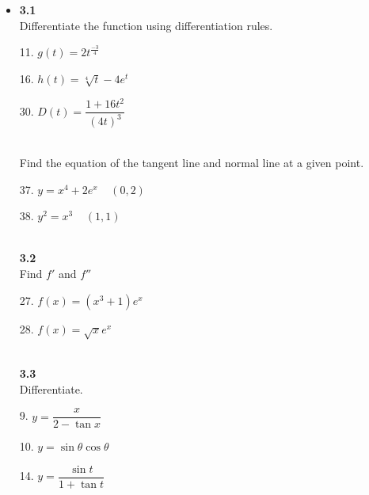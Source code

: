 \documentclass{letter}
\begin{document}
	\begin{itemize}
		\item[] \textbf{3.1}\\
		
		Differentiate the function using differentiation rules.\\
		\begin{minipage}[t]{0.3\textwidth}
			11. $g(t) = 2t^{\frac{-3}{4}}$
		\end{minipage}
		\begin{minipage}[t]{0.3\textwidth}
			16. $h(t) = \sqrt[4]{t} - 4e^t$
		\end{minipage}
		\begin{minipage}[t]{0.3\textwidth}
			30. $D(t) = \dfrac{1+16t^2}{(4t)^3}$\\
		\end{minipage}\\
		
		Find the equation of the tangent line and normal line at a given point.\\
		\begin{minipage}[t]{0.5\textwidth}
			37. $y = x^4 + 2e^x \;\;\;\; (0, 2)$
		\end{minipage}
		\begin{minipage}[t]{0.5\textwidth}
			38. $y^2 = x^3 \;\;\;\; (1, 1)$\\
		\end{minipage}\\
		
		\textbf{3.2}\\
		
		Find $f'$ and $f''$\\
		\begin{minipage}[t]{0.5\textwidth}
			27. $f(x) = (x^3 + 1)e^x$
		\end{minipage}
		\begin{minipage}[t]{0.5\textwidth}
			28. $f(x) = \sqrt x e^x$
		\end{minipage}\\
		
		\textbf{3.3}\\
		
		Differentiate.\\
		\begin{minipage}[t]{0.3\textwidth}
			9. $y = \dfrac{x}{2- \tan x}$
		\end{minipage}
		\begin{minipage}[t]{0.3\textwidth}
			10. $y = \sin \theta \cos \theta$
		\end{minipage}
		\begin{minipage}[t]{0.3\textwidth}
			14. $y = \dfrac{\sin t}{1 + \tan t}$\\
		\end{minipage}\\
		

\end{itemize}
\end{document}
